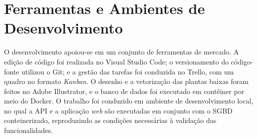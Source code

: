 \section{Ferramentas e Ambientes de Desenvolvimento}\label{sec:ferramentas}

O desenvolvimento apoiou-se em um conjunto de ferramentas de mercado. A edição de código foi realizada no Visual Studio Code; o versionamento do código-fonte utilizou o Git; e a gestão das tarefas foi conduzida no Trello, com um quadro no formato \textit{Kanban}. O desenho e a vetorização das plantas baixas foram feitos no Adobe Illustrator, e o banco de dados foi executado em contêiner por meio do Docker. O trabalho foi conduzido em ambiente de desenvolvimento local, no qual a API e a aplicação \textit{web} são executadas em conjunto com o SGBD conteinerizado, reproduzindo as condições necessárias à validação das funcionalidades.

\pagebreak

